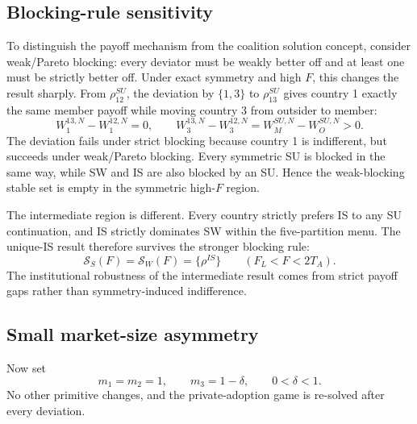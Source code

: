 

\subsection{Blocking-rule sensitivity}
\label{subsec:blocking-rule-sensitivity}

To distinguish the payoff mechanism from the coalition solution concept, consider weak/Pareto blocking: every deviator must be weakly better off and at least one must be strictly better off. Under exact symmetry and high $F$, this changes the result sharply. From $\rho_{12}^{SU}$, the deviation by $\{1,3\}$ to $\rho_{13}^{SU}$ gives country 1 exactly the same member payoff while moving country 3 from outsider to member:
\begin{equation}
    W_1^{13,N}-W_1^{12,N}=0,
    \qquad
    W_3^{13,N}-W_3^{12,N}
    =
    W_M^{SU,N}-W_O^{SU,N}>0.
    \label{eq:weak-blocking-indifference}
\end{equation}
The deviation fails under strict blocking because country 1 is indifferent, but succeeds under weak/Pareto blocking. Every symmetric SU is blocked in the same way, while SW and IS are also blocked by an SU. Hence the weak-blocking stable set is empty in the symmetric high-$F$ region.

The intermediate region is different. Every country strictly prefers IS to any SU continuation, and IS strictly dominates SW within the five-partition menu. The unique-IS result therefore survives the stronger blocking rule:
\begin{equation}
    \mathcal S_S(F)
    =
    \mathcal S_W(F)
    =
    \{\rho^{IS}\}
    \qquad
    (F_L<F<2T_A).
    \label{eq:strict-weak-intermediate}
\end{equation}
The institutional robustness of the intermediate result comes from strict payoff gaps rather than symmetry-induced indifference.

\subsection{Small market-size asymmetry}
\label{subsec:coalition-asymmetry}

Now set
\begin{equation}
    m_1=m_2=1,
    \qquad
    m_3=1-\delta,
    \qquad
    0<\delta<1.
    \label{eq:secondary-market-sizes}
\end{equation}
No other primitive changes, and the private-adoption game is re-solved after every deviation.

